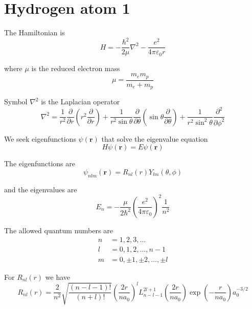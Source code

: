 

\section*{Hydrogen atom 1}

The Hamiltonian is
\begin{equation*}
H=-\frac{\hbar^2}{2\mu}\nabla^2-\frac{e^2}{4\pi\varepsilon_0r}
\end{equation*}

where $\mu$ is the reduced electron mass
\begin{equation*}
\mu=\frac{m_e m_p}{m_e+m_p}
\end{equation*}

Symbol $\nabla^2$ is the Laplacian operator
\begin{equation*}
\nabla^2=\frac{1}{r^2}\frac{\partial}{\partial r}
\left(r^2\frac{\partial}{\partial r}\right)
+
\frac{1}{r^2\sin\theta}\frac{\partial}{\partial\theta}
\left(\sin\theta\frac{\partial}{\partial\theta}\right)
+
\frac{1}{r^2\sin^2\theta}\frac{\partial^2}{\partial\phi^2}
\end{equation*}

We seek eigenfunctions $\psi(\mathbf r)$ that solve the eigenvalue equation
\begin{equation*}
H\psi(\mathbf r)=E\psi(\mathbf r)
\end{equation*}

The eigenfunctions are
\begin{equation*}
\psi_{nlm}(\mathbf r)=R_{nl}(r)Y_{lm}(\theta,\phi)
\end{equation*}

and the eigenvalues are
\begin{equation*}
E_n=-\frac{\mu}{2\hbar^2}\left(\frac{e^2}{4\pi\varepsilon_0}\right)^2\frac{1}{n^2}
\end{equation*}

The allowed quantum numbers are
\begin{align*}
n&=1,2,3,\ldots
\\
l&=0,1,2,\ldots,n-1
\\
m&=0,\pm1,\pm2,\ldots,\pm l
\end{align*}

For $R_{nl}(r)$ we have
\begin{equation*}
R_{nl}(r)=
\frac{2}{n^2}
\sqrt{\frac{(n-l-1)!}{(n+l)!}}
\left(\frac{2r}{na_0}\right)^l
L_{n-l-1}^{2l+1}\left(\frac{2r}{na_0}\right)
\exp\left(-\frac{r}{na_0}\right)
a_0^{-3/2}
\end{equation*}

